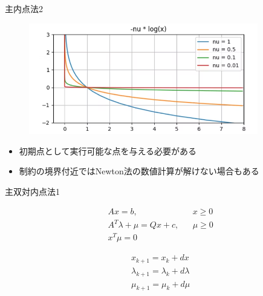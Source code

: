 \documentclass[dvipdfmx,12pt]{beamer}
\begin{document}
    \begin{frame}{主内点法2}
        \footnotesize
        \begin{figure}[H]
            \centering
            \includegraphics[clip, width = 10.0cm]{barrier.png}
        \end{figure}
        \centering
        \tiny{
        }
        \footnotesize
        \begin{itemize}
            \item 初期点として実行可能な点を与える必要がある
            \item 制約の境界付近ではNewton法の数値計算が解けない場合もある
        \end{itemize}
    \end{frame}

    \begin{frame}{主双対内点法1}
        \footnotesize

        \centering
        
        \begin{align*}
            &{Ax} = {b}, && {x} \geq 0 \\
            &{A}^T {\lambda} + \mu = {Qx} + {c}, && \mu \geq 0 \\
            &{x}^T \mu = 0
        \end{align*}
                    
        \begin{tcolorbox}[title={$x$, $\lambda$, $\mu$全てに対してニュートン法を行う}]
            \vspace{-1em}
            \begin{align*}
                &x_{k+1} = x_k + dx \\
                &\lambda_{k+1} = \lambda_k + d\lambda \\
                &\mu_{k+1} = \mu_k + d\mu
            \end{align*}
        \end{tcolorbox}
        

    \end{frame}
    
\end{document}
